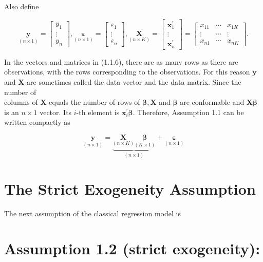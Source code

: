 \documentclass[10pt]{article}
\begin{document}
Also define

\[
\underset{(n \times 1)}{\mathbf{y}}=\left[\begin{array}{c}
y_{1}  \tag{1.1.6}\\
\vdots \\
y_{n}
\end{array}\right], \underset{(n \times 1)}{\boldsymbol{\varepsilon}}=\left[\begin{array}{c}
\varepsilon_{1} \\
\vdots \\
\varepsilon_{n}
\end{array}\right], \underset{(n \times K)}{\mathbf{X}}=\left[\begin{array}{c}
\mathbf{x}_{1}^{\prime} \\
\vdots \\
\mathbf{x}_{n}^{\prime}
\end{array}\right]=\left[\begin{array}{ccc}
x_{11} & \cdots & x_{1 K} \\
\vdots & \cdots & \vdots \\
x_{n 1} & \cdots & x_{n K}
\end{array}\right] .
\]

In the vectors and matrices in (1.1.6), there are as many rows as there are observations, with the rows corresponding to the observations. For this reason $\mathbf{y}$ and $\mathbf{X}$ are sometimes called the data vector and the data matrix. Since the number of\\
columns of $\mathbf{X}$ equals the number of rows of $\boldsymbol{\beta}, \mathbf{X}$ and $\boldsymbol{\beta}$ are conformable and $\mathbf{X} \boldsymbol{\beta}$ is an $n \times 1$ vector. Its $i$-th element is $\mathbf{x}_{i}^{\prime} \boldsymbol{\beta}$. Therefore, Assumption 1.1 can be written compactly as

$$
\underset{(n \times 1)}{\mathbf{y}}=\underbrace{\underset{(n \times K)}{\mathbf{X}} \underset{(K \times 1)}{\boldsymbol{\beta}}}_{(n \times 1)}+\underset{(n \times 1)}{\boldsymbol{\varepsilon}}
$$

\section*{The Strict Exogeneity Assumption}
The next assumption of the classical regression model is

\section*{Assumption 1.2 (strict exogeneity):}
\end{document}
